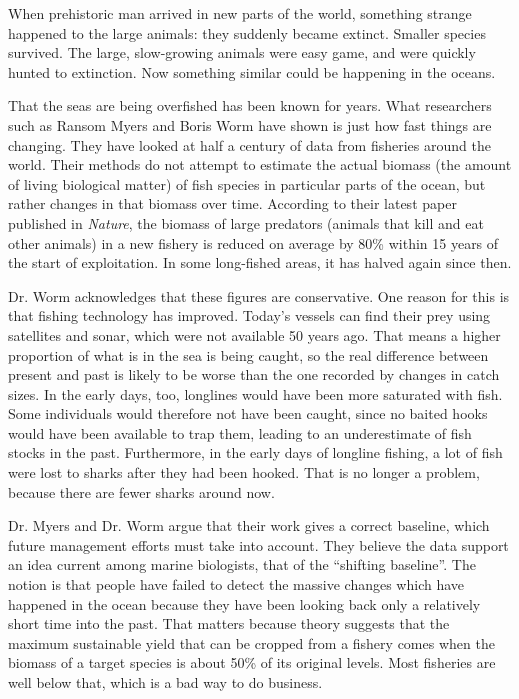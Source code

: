 When prehistoric man arrived in new parts of the world, something
strange happened to the large animals: they suddenly became extinct.
Smaller species survived. The large, slow-growing animals were easy
game, and were quickly hunted to extinction. Now something similar could
be happening in the oceans.

That the seas are being overfished has been known for years. What
researchers such as Ransom Myers and Boris Worm have shown is just how
fast things are changing. They have looked at half a century of data
from fisheries around the world. Their methods do not attempt to
estimate the actual biomass (the amount of living biological matter) of
fish species in particular parts of the ocean, but rather changes in
that biomass over time. According to their latest paper published in
\emph{Nature}, the biomass of large predators (animals that kill and eat
other animals) in a new fishery is reduced on average by 80\% within 15
years of the start of exploitation. In some long-fished areas, it has
halved again since then.

Dr. Worm acknowledges that these figures are conservative. One reason
for this is that fishing technology has improved. Today's vessels can
find their prey using satellites and sonar, which were not available 50
years ago. That means a higher proportion of what is in the sea is being
caught, so the real difference between present and past is likely to be
worse than the one recorded by changes in catch sizes. In the early
days, too, longlines would have been more saturated with fish. Some
individuals would therefore not have been caught, since no baited hooks
would have been available to trap them, leading to an underestimate of
fish stocks in the past. Furthermore, in the early days of longline
fishing, a lot of fish were lost to sharks after they had been hooked.
That is no longer a problem, because there are fewer sharks around now.

Dr. Myers and Dr. Worm argue that their work gives a correct baseline,
which future management efforts must take into account. They believe the
data support an idea current among marine biologists, that of the
``shifting baseline''. The notion is that people have failed to detect
the massive changes which have happened in the ocean because they have
been looking back only a relatively short time into the past. That
matters because theory suggests that the maximum sustainable yield that
can be cropped from a fishery comes when the biomass of a target species
is about 50\% of its original levels. Most fisheries are well below
that, which is a bad way to do business.

